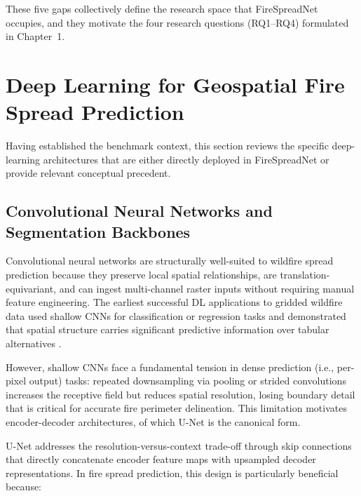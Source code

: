 These five gaps collectively define the research space that FireSpreadNet occupies, and they motivate the four research questions (RQ1–RQ4) formulated in Chapter~1.

\section{Deep Learning for Geospatial Fire Spread Prediction}
\label{sec:sota_dl}

Having established the benchmark context, this section reviews the specific deep-learning architectures that are either directly deployed in FireSpreadNet or provide relevant conceptual precedent.

\subsection{Convolutional Neural Networks and Segmentation Backbones}
\label{sec:sota_cnn}

Convolutional neural networks are structurally well-suited to wildfire spread prediction because they preserve local spatial relationships, are translation-equivariant, and can ingest multi-channel raster inputs without requiring manual feature engineering.
The earliest successful DL applications to gridded wildfire data used shallow CNNs for classification or regression tasks and demonstrated that spatial structure carries significant predictive information over tabular alternatives \citep{huot2022next}.

However, shallow CNNs face a fundamental tension in dense prediction (i.e., per-pixel output) tasks: repeated downsampling via pooling or strided convolutions increases the receptive field but reduces spatial resolution, losing boundary detail that is critical for accurate fire perimeter delineation.
This limitation motivates encoder-decoder architectures, of which U-Net \citep{ronneberger2015unet} is the canonical form.

U-Net addresses the resolution-versus-context trade-off through skip connections that directly concatenate encoder feature maps with upsampled decoder representations.
In fire spread prediction, this design is particularly beneficial because:

